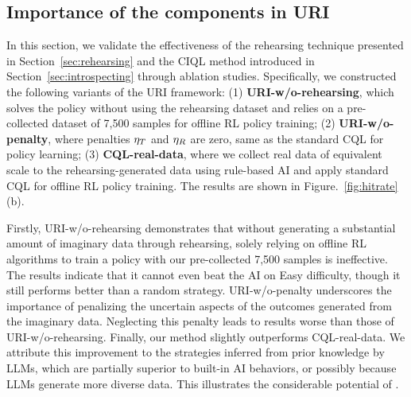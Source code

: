 \vspace{-1mm}
\subsection{Importance of the components in URI}
\label{exp:abl}

In this section, we validate the effectiveness of the rehearsing technique presented in Section~\ref{sec:rehearsing} and the CIQL method introduced in Section~\ref{sec:introspecting} through ablation studies. Specifically, we constructed the following variants of the URI framework: (1) \textbf{URI-w/o-rehearsing}, which solves the policy without using the rehearsing dataset and relies on a pre-collected dataset of 7,500 samples for offline RL policy training; (2) \textbf{URI-w/o-penalty}, where penalties  $\eta_T$ and $\eta_R$ are zero, same as the standard CQL for policy learning; (3) \textbf{CQL-real-data}, where we collect real data of equivalent scale to the rehearsing-generated data using rule-based AI and apply standard CQL for offline RL policy training. The results are shown in Figure.~\ref{fig:hitrate}(b).

Firstly, URI-w/o-rehearsing demonstrates that without generating a substantial amount of imaginary data through rehearsing, solely relying on offline RL algorithms to train a policy with our pre-collected 7,500 samples is ineffective. The results indicate that it cannot even beat the AI on Easy difficulty, though it still performs better than a random strategy. URI-w/o-penalty underscores the importance of penalizing the uncertain aspects of the outcomes generated from the imaginary data. Neglecting this penalty leads to results worse than those of URI-w/o-rehearsing. 
Finally, our method slightly outperforms CQL-real-data. We attribute this improvement to the strategies inferred from prior knowledge by LLMs, which are partially superior to built-in AI behaviors, or possibly because LLMs generate more diverse data. This illustrates the considerable potential of \topic.



